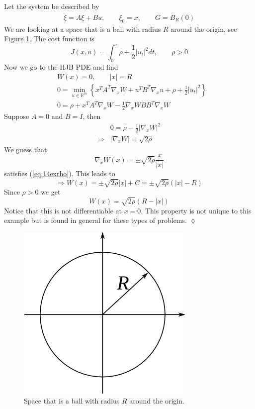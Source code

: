 \begin{example}
\label{ex:14exit}
Let the system be described by
\begin{align*}
\dot{\xi} = A\xi+Bu, \qquad \xi_0 = x, \qquad G=B_R(0)
\end{align*}
We are looking at a space that is a ball with radius $R$ around the origin, see Figure \ref{fig:14circle}. The cost function is
$$J(x,u) = \int_0^\tau \rho + \frac{1}{2}|u_t|^2dt, \qquad \rho>0$$
Now we go to the HJB PDE and find
\begin{align*}
&W(x) = 0, \qquad |x|=R \\
&0 = \min_{u\in\mathbb{R}^m} \left\lbrace x^TA^T\nabla_xW + u^TB^T\nabla_xu + \rho + \frac{1}{2}|u_t|^2 \right\rbrace \\
&0 = \rho + x^TA^T\nabla_xW - \frac{1}{2}\nabla_xWBB^T\nabla_xW
\end{align*}
Suppose $A=0$ and $B=I$, then
\begin{align}
\label{eq:14exrho}
&0 = \rho - \frac{1}{2}|\nabla_xW|^2 \nonumber \\
\Rightarrow &|\nabla_xW| = \sqrt{2\rho}
\end{align}
We guess that
$$\nabla_xW(x) = \pm \sqrt{2\rho}\frac{x}{|x|}$$
satisfies (\ref{eq:14exrho}). This leads to
$$\Rightarrow W(x) = \pm\sqrt{2\rho}|x|+C = \pm\sqrt{2\rho}(|x|-R)$$
Since $\rho>0$ we get
$$W(x) = \sqrt{2\rho}(R-|x|)$$
Notice that this is not differentiable at $x=0$. This property is not unique to this example but is found in general for these types of problems.
$\lozenge$
\end{example}

\begin{figure}[ht!]
	\centering
	\includegraphics[width=.4\textwidth]{images/14circle}
	\caption{Space that is a ball with radius $R$ around the origin.}
	\label{fig:14circle}
\end{figure}

